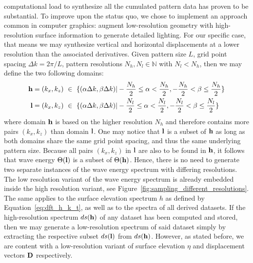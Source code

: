 computational load to synthesize all the cumulated pattern data has proven to be
substantial. To improve upon the status quo, we chose to implement an approach
common in computer graphics: augment low-resolution geometry with high-resolution
surface information to generate detailed lighting. For our specific case, that
means we may synthesize vertical and horizontal displacements at a lower
resolution than the associated derivatives.
%
%
Given pattern size $L$, grid point spacing $\Delta k = 2\pi/L$, pattern
resolutions $N_h,N_l \in \mathbb{N}$ with $N_l < N_h$, then we may define the
two following \wavevector domains:
%
\begin{align}
\mathbf{h} = (k_x,k_z)~&\in~\{(\alpha\Delta k,\beta\Delta k)|-\frac{N_h}{2}\leq\alpha<\frac{N_h}{2},-\frac{N_h}{2}<\beta\leq\frac{N_h}{2}\}\\
\mathbf{l} = (k_x,k_z)~&\in~\{(\alpha\Delta k,\beta\Delta k)|-\frac{N_l}{2}\leq\alpha<\frac{N_l}{2},-\frac{N_l}{2}<\beta\leq\frac{N_l}{2}\}
\end{align}
where \wavevector domain $\mathbf{h}$ is based on the higher resolution $N_h$ and therefore contains
more pairs $(k_x, k_z)$ than \wavevector domain $\mathbf{l}$. One may notice that $\mathbf{l}$ is a
subset of $\mathbf{h}$ as long as both \wavevector domains share the same grid point
spacing, and thus the same underlying pattern size. Because all pairs $(k_x, k_z)$ in $\mathbf{l}$ are also to be found
in $\mathbf{h}$, it follows that wave energy $\Theta(\mathbf{l})$ is a subset of
$\Theta(\mathbf{h})$. Hence, there is no need to generate two separate instances
of the wave energy spectrum with differing resolutions.
The low resolution variant of the wave energy spectrum is already embedded inside the
high resolution variant, see Figure~\ref{fig:sampling_different_resolutions}.
The same applies to the surface elevation spectrum $h$ as defined
by Equation~\ref{eq:dft_h_k_t}, as well as to the spectra of all derived datasets.
If the high-resolution spectrum $ds(\mathbf{h})$ of any dataset has been computed and stored,
then we may generate a low-resolution spectrum of said dataset simply by extracting
the respective subset $ds(\mathbf{l})$ from $ds(\mathbf{h})$. However, as stated before,
we are content with a low-resolution variant of surface elevation $\eta$ and
displacement vectors $\mathbf{D}$ respectively.


